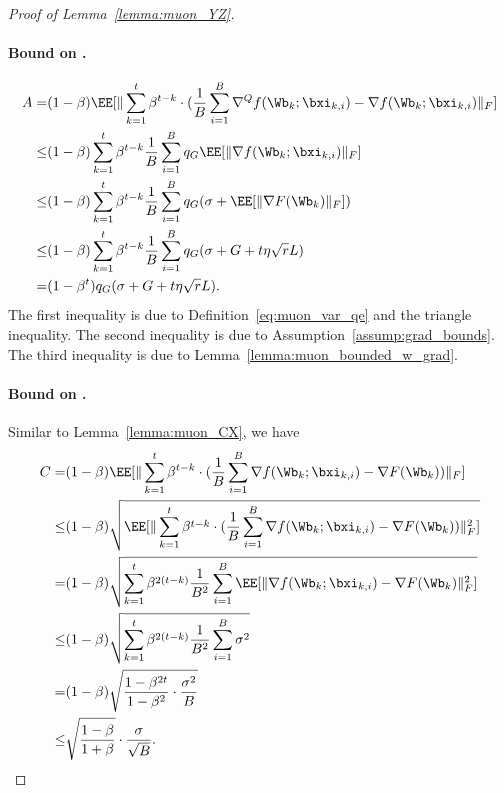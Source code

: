 \documentclass[11pt, letterpaper]{article}
\begin{document}
\begin{proof}[Proof of Lemma~\ref{lemma:muon_YZ}]
\paragraph{Bound on .}
\begin{align}\label{eq:muon_YZ_A}
    A
    =& (1-\beta)\EE[\|\sum_{k=1}^t\beta^{t-k}\cdot(\frac{1}{B}\sum_{i=1}^B   \nabla^Q f(\Wb_k;\bxi_{k,i}) -\nabla f(\Wb_k;\bxi_{k,i}) \|_F] \notag \\
    \le& (1-\beta)\sum_{k=1}^t\beta^{t-k}\frac{1}{B}\sum_{i=1}^B q_G\EE[\| \nabla f(\Wb_k;\bxi_{k,i}) \|_F] \notag \\
    \le& (1-\beta)\sum_{k=1}^t\beta^{t-k}\frac{1}{B}\sum_{i=1}^B q_G(\sigma + \EE[\| \nabla F(\Wb_k) \|_F]) \notag \\
    \le& (1-\beta)\sum_{k=1}^t\beta^{t-k}\frac{1}{B}\sum_{i=1}^B q_G(\sigma + G + t\eta\sqrt{r}L) \notag \\
    =& (1-\beta^t)q_G(\sigma + G + t\eta\sqrt{r}L).
\end{align}
The first inequality is due to Definition~\ref{eq:muon_var_qe} and the triangle inequality. The second inequality is due to Assumption~\ref{assump:grad_bounds}. The third inequality is due to Lemma~\ref{lemma:muon_bounded_w_grad}.


\paragraph{Bound on .}
Similar to Lemma~\ref{lemma:muon_CX}, we have
\begin{align}\label{eq:muon_YZ_C}
    C
    =& (1-\beta)\EE[\|\sum_{k=1}^t\beta^{t-k}\cdot(\frac{1}{B}\sum_{i=1}^B   \nabla f(\Wb_k;\bxi_{k,i}) -\nabla F(\Wb_k) ) \|_F] \notag \\
    \le& (1-\beta)\sqrt{\EE[\|\sum_{k=1}^t\beta^{t-k}\cdot(\frac{1}{B}\sum_{i=1}^B   \nabla f(\Wb_k;\bxi_{k,i}) -\nabla F(\Wb_k) ) \|_F^2]} \notag \\
    =& (1-\beta)\sqrt{\sum_{k=1}^t\beta^{2(t-k)}\frac{1}{B^2}\sum_{i=1}^B\EE[\|   \nabla f(\Wb_k;\bxi_{k,i}) -\nabla F(\Wb_k)  \|_F^2]} \notag \\
    \le& (1-\beta)\sqrt{\sum_{k=1}^t\beta^{2(t-k)}\frac{1}{B^2}\sum_{i=1}^B \sigma^2} \notag \\
    =& (1-\beta)\sqrt{\frac{1-\beta^{2t}}{1-\beta^2}\cdot\frac{\sigma^2}{B}} \notag \\
    \le& \sqrt{\frac{1-\beta}{1+\beta}}\cdot\frac{\sigma}{\sqrt{B}}. 
\end{align}


\end{proof}
\end{document}

